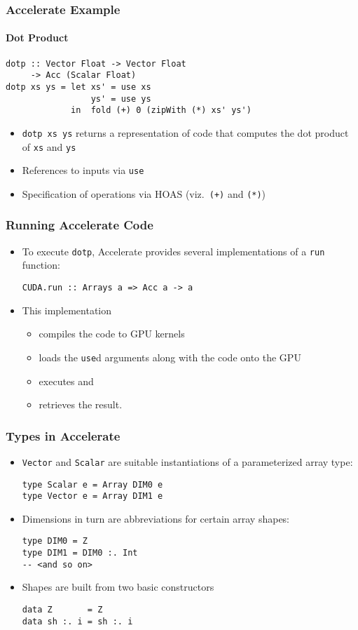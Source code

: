 \documentclass{beamer}
\begin{document}
\begin{frame}[fragile]
  \frametitle{Accelerate Example}
  \framesubtitle{Dot Product}
\begin{verbatim}
dotp :: Vector Float -> Vector Float
     -> Acc (Scalar Float)
dotp xs ys = let xs' = use xs
                 ys' = use ys
             in  fold (+) 0 (zipWith (*) xs' ys')
\end{verbatim}
  \begin{itemize}
  \item \texttt{dotp xs ys} returns a representation of code that
    computes the dot product of \texttt{xs} and \texttt{ys}
  \item References to inputs via \texttt{use}
  \item Specification of operations via HOAS (viz.\ \texttt{(+)} and \texttt{(*)})
  \end{itemize}
\end{frame}

\begin{frame}[fragile]
  \frametitle{Running Accelerate Code}
  \begin{itemize}
  \item To execute \texttt{dotp}, Accelerate provides several
    implementations of a \texttt{run} function:
\begin{verbatim}
CUDA.run :: Arrays a => Acc a -> a
\end{verbatim}
  \item This implementation
    \begin{itemize}
    \item compiles the code to GPU kernels
    \item loads the \texttt{use}d arguments along with the code onto
      the GPU
    \item executes and
    \item retrieves the result.
    \end{itemize}
  \end{itemize}
\end{frame}

\begin{frame}[fragile]
  \frametitle{Types in Accelerate}
  \begin{itemize}
  \item \texttt{Vector} and \texttt{Scalar} are suitable
    instantiations of a parameterized array type:
\begin{verbatim}
type Scalar e = Array DIM0 e
type Vector e = Array DIM1 e
\end{verbatim}
  \item Dimensions in turn are abbreviations for certain array shapes:
\begin{verbatim}
type DIM0 = Z
type DIM1 = DIM0 :. Int
-- <and so on>
\end{verbatim}
  \item Shapes are built from two basic constructors
\begin{verbatim}
data Z       = Z
data sh :. i = sh :. i
\end{verbatim}
  \end{itemize}
\end{frame}
\end{document}
